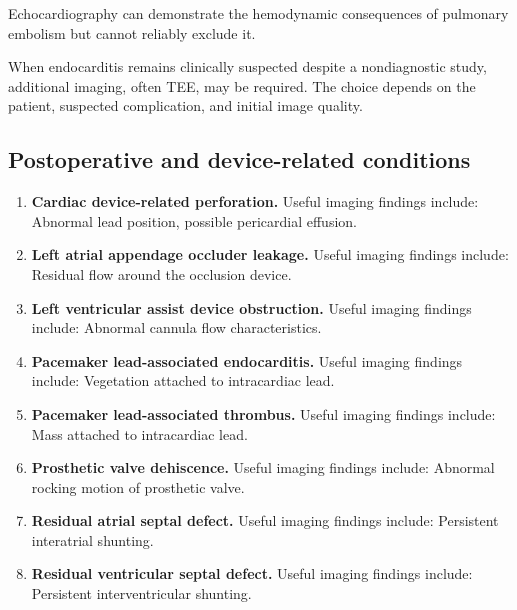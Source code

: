 Echocardiography can demonstrate the hemodynamic consequences of pulmonary embolism but cannot reliably exclude it.

When endocarditis remains clinically suspected despite a nondiagnostic study, additional imaging, often TEE, may be required. The choice depends on the patient, suspected complication, and initial image quality.

\subsection{Postoperative and device-related conditions}
\begin{enumerate}[leftmargin=*,itemsep=0.45em,topsep=0.4em]
\item \textbf{Cardiac device-related perforation.} Useful imaging findings include: Abnormal lead position, possible pericardial effusion.
\item \textbf{Left atrial appendage occluder leakage.} Useful imaging findings include: Residual flow around the occlusion device.
\item \textbf{Left ventricular assist device obstruction.} Useful imaging findings include: Abnormal cannula flow characteristics.
\item \textbf{Pacemaker lead-associated endocarditis.} Useful imaging findings include: Vegetation attached to intracardiac lead.
\item \textbf{Pacemaker lead-associated thrombus.} Useful imaging findings include: Mass attached to intracardiac lead.
\item \textbf{Prosthetic valve dehiscence.} Useful imaging findings include: Abnormal rocking motion of prosthetic valve.
\item \textbf{Residual atrial septal defect.} Useful imaging findings include: Persistent interatrial shunting.
\item \textbf{Residual ventricular septal defect.} Useful imaging findings include: Persistent interventricular shunting.
\end{enumerate}

